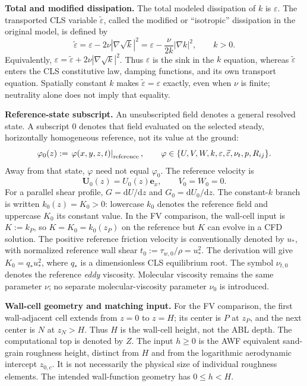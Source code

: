 \documentclass[11pt,a4paper]{article}
\numberwithin{equation}{section}
\newcommand{\dd}{\mathrm{d}}
\newcommand{\eps}{\varepsilon}
\newcommand{\et}{\widetilde{\varepsilon}}
\newcommand{\nut}{\nu_t}
\newcommand{\ust}{u_*}
\newcommand{\qs}{q_*}
\begin{document}
\textbf{Total and modified dissipation.}
The total modeled dissipation of $k$ is $\eps$. The transported CLS
variable $\et$, called the modified or ``isotropic'' dissipation in the
original model, is defined by \cite[Eq.~(5) and nomenclature]{CLS1996}
\begin{equation}
 \boxed{\et=\eps-2\nu\left|\nabla\sqrt{k}\right|^2
 =\eps-\frac{\nu}{2k}|\nabla k|^2,\qquad k>0.}
 \label{eq:epssplit}
\end{equation}
Equivalently, $\eps=\et+2\nu|\nabla\sqrt{k}|^2$. Thus $\eps$ is the
sink in the $k$ equation, whereas $\et$ enters the CLS constitutive law,
damping functions, and its own transport equation. Spatially constant
$k$ makes $\et=\eps$ exactly, even when $\nu$ is finite; neutrality alone
does not imply that equality.

\textbf{Reference-state subscript.}
An unsubscripted field denotes a general resolved state. A subscript $0$
denotes that field evaluated on the selected steady, horizontally
homogeneous reference, not its value at the ground:
\begin{equation}
 \varphi_0(z):=\left.\varphi(x,y,z,t)\right|_{\rm reference},
 \qquad \varphi\in\{U,V,W,k,\eps,\et,\nut,p,R_{ij}\}.
 \label{eq:reference-notation}
\end{equation}
Away from that state, $\varphi$ need not equal $\varphi_0$. The reference
velocity is
\begin{equation}
 \bm U_0(z)=U_0(z)\bm e_x,\qquad V_0=W_0=0.
 \label{eq:parallel}
\end{equation}
For a parallel shear profile, $G=\dd U/\dd z$ and
$G_0=\dd U_0/\dd z$. The constant-$k$ branch is written
$k_0(z)=K_0>0$: lowercase $k_0$ denotes the reference field and uppercase
$K_0$ its constant value. In the FV comparison, the wall-cell input is $K:=k_P$,
so $K=K_0=k_0(z_P)$ on the reference but $K$ can evolve in a CFD solution.
The positive reference friction velocity is conventionally denoted by
$\ust$, with normalized reference wall shear
$t_0:=\tau_{w,0}/\rho=\ust^2$. The derivation will give
$K_0=\qs\ust^2$, where $\qs$ is a dimensionless CLS equilibrium root.
The symbol $\nu_{t,0}$ denotes the reference \emph{eddy} viscosity.
Molecular viscosity remains the same parameter $\nu$; no separate
molecular-viscosity parameter $\nu_0$ is introduced.

\textbf{Wall-cell geometry and matching input.}
For the FV comparison, the first wall-adjacent cell extends from $z=0$ to $z=H$; its center is
$P$ at $z_P$, and the next center is $N$ at $z_N>H$. Thus $H$ is the
wall-cell height, not the ABL depth. The computational top is denoted by
$Z$. The input $h\geq0$ is the AWF equivalent sand-grain roughness height,
distinct from $H$ and from the logarithmic aerodynamic intercept
$z_{0,c}$. It is not necessarily the physical size of individual roughness
elements. The intended wall-function geometry has $0\leq h<H$.
\end{document}
